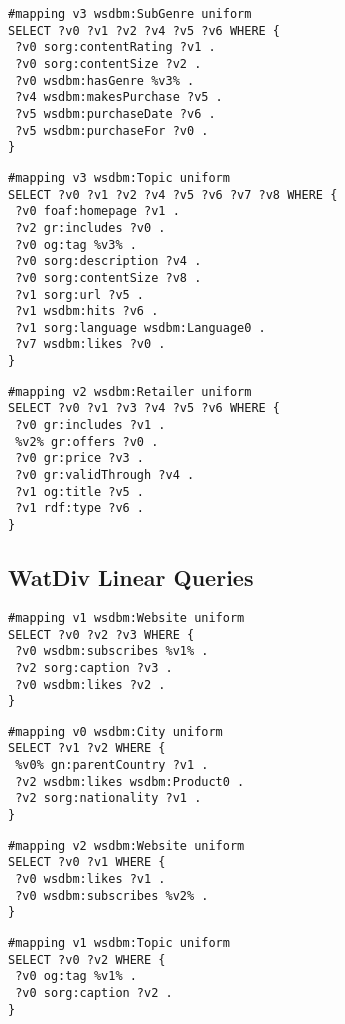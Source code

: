\begin{lstlisting}[caption={F3},label=query:F3]
#mapping v3 wsdbm:SubGenre uniform
SELECT ?v0 ?v1 ?v2 ?v4 ?v5 ?v6 WHERE {
 ?v0 sorg:contentRating ?v1 .
 ?v0 sorg:contentSize ?v2 .
 ?v0 wsdbm:hasGenre %v3% .
 ?v4 wsdbm:makesPurchase ?v5 .
 ?v5 wsdbm:purchaseDate ?v6 .
 ?v5 wsdbm:purchaseFor ?v0 .
}
\end{lstlisting}

\begin{lstlisting}[caption={F4},label=query:F4]
#mapping v3 wsdbm:Topic uniform
SELECT ?v0 ?v1 ?v2 ?v4 ?v5 ?v6 ?v7 ?v8 WHERE {
 ?v0 foaf:homepage ?v1 .
 ?v2 gr:includes ?v0 .
 ?v0 og:tag %v3% .
 ?v0 sorg:description ?v4 .
 ?v0 sorg:contentSize ?v8 .
 ?v1 sorg:url ?v5 .
 ?v1 wsdbm:hits ?v6 .
 ?v1 sorg:language wsdbm:Language0 .
 ?v7 wsdbm:likes ?v0 .
}
\end{lstlisting}

\begin{lstlisting}[caption={F5},label=query:F5]
#mapping v2 wsdbm:Retailer uniform
SELECT ?v0 ?v1 ?v3 ?v4 ?v5 ?v6 WHERE {
 ?v0 gr:includes ?v1 .
 %v2% gr:offers ?v0 .
 ?v0 gr:price ?v3 .
 ?v0 gr:validThrough ?v4 .
 ?v1 og:title ?v5 .
 ?v1 rdf:type ?v6 .
}

\end{lstlisting}

\subsection{WatDiv Linear Queries} 

\begin{lstlisting}[caption={L1},label=query:L1]
#mapping v1 wsdbm:Website uniform
SELECT ?v0 ?v2 ?v3 WHERE {
 ?v0 wsdbm:subscribes %v1% .
 ?v2 sorg:caption ?v3 .
 ?v0 wsdbm:likes ?v2 .
}
\end{lstlisting}

\begin{lstlisting}[caption={L2},label=query:L2]
#mapping v0 wsdbm:City uniform
SELECT ?v1 ?v2 WHERE {
 %v0% gn:parentCountry ?v1 .
 ?v2 wsdbm:likes wsdbm:Product0 .
 ?v2 sorg:nationality ?v1 .
}
\end{lstlisting}

\begin{lstlisting}[caption={L3},label=query:L3]
#mapping v2 wsdbm:Website uniform
SELECT ?v0 ?v1 WHERE {
 ?v0 wsdbm:likes ?v1 .
 ?v0 wsdbm:subscribes %v2% .
}
\end{lstlisting}

\begin{lstlisting}[caption={L4},label=query:L4]
#mapping v1 wsdbm:Topic uniform
SELECT ?v0 ?v2 WHERE {
 ?v0 og:tag %v1% .
 ?v0 sorg:caption ?v2 .
}
\end{lstlisting}

